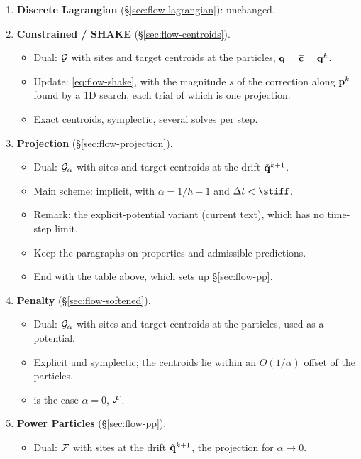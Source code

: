 \documentclass[main.tex]{subfiles}
\begin{document}
\begin{enumerate}
  \item \textbf{Discrete Lagrangian} (\S\ref{sec:flow-lagrangian}): unchanged.
  \item \textbf{Constrained / SHAKE} (\S\ref{sec:flow-centroids}).
    \begin{itemize}
      \item Dual: $\mathcal{G}$ with sites and target centroids at the particles, $\mathbf{q} = \overline{\mathbf{c}} = \mathbf{q}^k$.
      \item Update: \eqref{eq:flow-shake}, with the magnitude $s$ of the correction along $\mathbf{p}^k$ found by a 1D search, each trial of which is one projection.
      \item Exact centroids, symplectic, several solves per step.
    \end{itemize}
  \item \textbf{Projection} (\S\ref{sec:flow-projection}).
    \begin{itemize}
      \item Dual: $\mathcal{G}_\alpha$ with sites and target centroids at the drift $\tilde{\mathbf{q}}^{k+1}$.
      \item Main scheme: implicit, with $\alpha = 1/h - 1$ and $\tstep < \stiff$.
      \item Remark: the explicit-potential variant (current text), which has no time-step limit.
      \item Keep the paragraphs on properties and admissible predictions.
      \item End with the table above, which sets up \S\ref{sec:flow-pp}.
    \end{itemize}
  \item \textbf{Penalty} (\S\ref{sec:flow-softened}).
    \begin{itemize}
      \item Dual: $\mathcal{G}_\alpha$ with sites and target centroids at the particles, used as a potential.
      \item Explicit and symplectic; the centroids lie within an $O(1/\alpha)$ offset of the particles.
      \item \citet{Gallouet2018Lagrangian} is the case $\alpha = 0$, \ie $\mathcal{F}$.
    \end{itemize}
  \item \textbf{Power Particles} (\S\ref{sec:flow-pp}).
    \begin{itemize}
      \item Dual: $\mathcal{F}$ with sites at the drift $\tilde{\mathbf{q}}^{k+1}$, \ie the projection for $\alpha \to 0$.

\end{itemize}
\end{enumerate}
\end{document}
